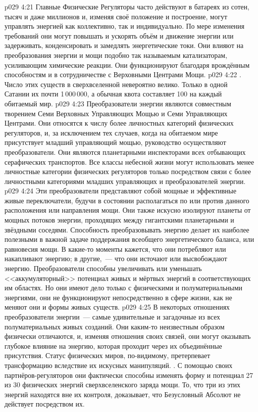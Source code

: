 \vs p029 4:21 Главные Физические Регуляторы часто действуют в батареях из сотен, тысяч и даже миллионов и, изменяя своё положение и построение, могут управлять энергией как коллективно, так и индивидуально. По мере изменения требований они могут повышать и ускорять объём и движение энергии или задерживать, конденсировать и замедлять энергетические токи. Они влияют на преобразования энергии и мощи подобно так называемым катализаторам, усиливающим химические реакции. Они функционируют благодаря врождённым способностям и в сотрудничестве с Верховными Центрами Мощи.
\vs p029 4:22 . Число этих существ в сверхвселенной невероятно велико. Только в одной Сатании их почти 1\,000\,000, а обычная квота составляет 100 на каждый обитаемый мир.
\vs p029 4:23 Преобразователи энергии являются совместным творением Семи Верховных Управляющих Мощью и Семи Управляющих Центрами. Они относятся к числу более личностных категорий физических регуляторов, и, за исключением тех случаев, когда на обитаемом мире присутствует младший управляющий мощью, руководство осуществляют преобразователи. Они являются планетарными инспекторами всех отбывающих серафических транспортов. Все классы небесной жизни могут использовать менее личностные категории физических регуляторов только посредством связи с более личностными категориями младших управляющих и преобразователей энергии.
\vs p029 4:24 Эти преобразователи представляют собой мощные и эффективные живые переключатели, будучи в состоянии располагаться по или против данного расположения или направления мощи. Они также искусно изолируют планеты от мощных потоков энергии, проходящих между гигантскими планетарными и звёздными соседями. Способность преобразовывать энергию делает их наиболее полезными в важной задаче поддержания всеобщего энергетического баланса, или равновесия мощи. В какие\hyp{}то моменты кажется, что они потребляют или накапливают энергию; в другие,~--- что они источают или высвобождают энергию. Преобразователи способны увеличивать или уменьшать <<аккумуляторный>> потенциал живых и мёртвых энергий в соответствующих им областях. Но они имеют дело только с физическими и полуматериальными энергиями, они не функционируют непосредственно в сфере жизни, как не меняют они и формы живых существ.
\vs p029 4:25 В некоторых отношениях преобразователи энергии~--- самые удивительные и загадочные из всех полуматериальных живых созданий. Они каким\hyp{}то неизвестным образом физически отличаются, и, изменяя отношения своих связей, они могут оказывать глубокое влияние на энергию, которая проходит через их объединённые присутствия. Статус физических миров, по\hyp{}видимому, претерпевает трансформацию вследствие их искусных манипуляций. . С помощью своих партнёров\hyp{}регуляторов они фактически способны изменять форму и потенциал 27 из 30 физических энергий сверхвселенского заряда мощи. То, что три из этих энергий находятся вне их контроля, доказывает, что Безусловный Абсолют не действует посредством их.
